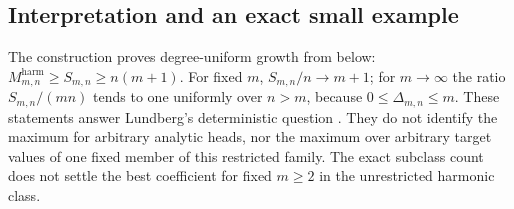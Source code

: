 \documentclass[UTF8,11pt]{ctexart}
\theoremstyle{definition}
\numberwithin{equation}{section}
\begin{document}
\subsection{Interpretation and an exact small example}
The construction proves degree-uniform growth from below:
$M^{\mathrm{harm}}_{m,n}\ge S_{m,n}\ge n(m+1)$. For fixed $m$,
$S_{m,n}/n\to m+1$; for $m\to\infty$ the ratio $S_{m,n}/(mn)$
tends to one uniformly over $n>m$, because $0\le\Delta_{m,n}\le m$.
These statements answer Lundberg's deterministic question
\cite[Section~4.2, \av, p.~9]{Lun23}. They do not identify the maximum
for arbitrary analytic heads, nor the maximum over arbitrary target
values of one fixed member of this restricted family.
The exact subclass count does not settle the best coefficient for fixed
$m\ge2$ in the unrestricted harmonic class.
\end{document}
